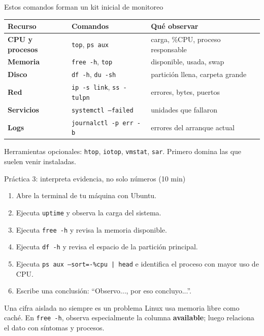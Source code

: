 \documentclass[aspectratio=169,10pt,c]{beamer}
\begin{document}
\begin{frame}{Estos comandos forman un kit inicial de monitoreo}
\begin{center}
\scriptsize
\begin{tabular}{>{\bfseries}p{2.5cm}p{3.4cm}p{5.2cm}}
\toprule
Recurso & Comandos & Qué observar \\
\midrule
CPU y procesos & \texttt{top}, \texttt{ps aux} & carga, \%CPU, proceso responsable \\
Memoria & \texttt{free -h}, \texttt{top} & disponible, usada, swap \\
Disco & \texttt{df -h}, \texttt{du -sh} & partición llena, carpeta grande \\
Red & \texttt{ip -s link}, \texttt{ss -tulpn} & errores, bytes, puertos \\
Servicios & \texttt{systemctl --failed} & unidades que fallaron \\
Logs & \texttt{journalctl -p err -b} & errores del arranque actual \\
\bottomrule
\end{tabular}
\end{center}
\vspace{0.15cm}
\small Herramientas opcionales: \texttt{htop}, \texttt{iotop}, \texttt{vmstat}, \texttt{sar}. Primero domina las que suelen venir instaladas.
\end{frame}

\begin{frame}{Práctica 3: interpreta evidencia, no solo números \textnormal{\small(10 min)}}
\begin{enumerate}\setlength\itemsep{6pt}\small
  \item Abre la terminal de tu máquina con Ubuntu.
  \item Ejecuta \texttt{uptime} y observa la carga del sistema.
  \item Ejecuta \texttt{free -h} y revisa la memoria disponible.
  \item Ejecuta \texttt{df -h} y revisa el espacio de la partición principal.
  \item Ejecuta \texttt{ps aux --sort=-\%cpu | head} e identifica el proceso con mayor uso de CPU.
  \item Escribe una conclusión: ``Observo..., por eso concluyo...''.
\end{enumerate}
\begin{alertblock}{Una cifra aislada no siempre es un problema}
\small Linux usa memoria libre como caché. En \texttt{free -h}, observa especialmente la columna \textbf{available}; luego relaciona el dato con síntomas y procesos.
\end{alertblock}
\end{frame}
\end{document}
